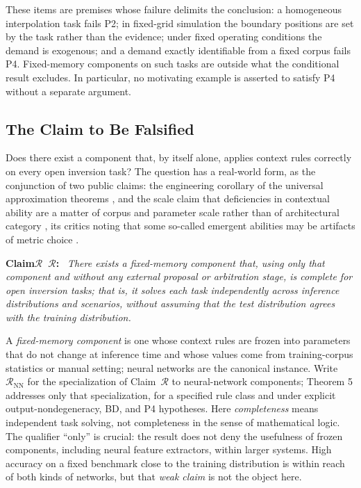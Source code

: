 \documentclass[twoside,11pt]{article}
\newenvironment{claim}[1][]{\par\medskip\noindent\textbf{Claim\ifx\relax#1\relax\else\ #1\fi:}\ \itshape}{\par\medskip} %
\begin{document}
These items are premises whose failure delimits the conclusion: a homogeneous interpolation task fails P2; in fixed-grid simulation the boundary positions are set by the task rather than the evidence; under fixed operating conditions the demand is exogenous; and a demand exactly identifiable from a fixed corpus fails P4. Fixed-memory components on such tasks are outside what the conditional result excludes. In particular, no motivating example is asserted to satisfy P4 without a separate argument.

\subsection{The Claim to Be Falsified}

Does there exist a component that, by itself alone, applies context rules correctly on every open inversion task? The question has a real-world form, as the conjunction of two public claims: the engineering corollary of the universal approximation theorems \citep{cybenko1989,hornik1989}, and the scale claim that deficiencies in contextual ability are a matter of corpus and parameter scale rather than of architectural category \citep{bubeck2023}, its critics noting that some so-called emergent abilities may be artifacts of metric choice \citep{schaeffer2023}.

\begin{claim}[$\mathcal{R}$]
There exists a fixed-memory component that, using only that component and without any external proposal or arbitration stage, is complete for open inversion tasks; that is, it solves each task independently across inference distributions and scenarios, without assuming that the test distribution agrees with the training distribution.
\end{claim}

A \emph{fixed-memory component} is one whose context rules are frozen into parameters that do not change at inference time and whose values come from training-corpus statistics or manual setting; neural networks are the canonical instance. Write $\mathcal{R}_{\mathrm{NN}}$ for the specialization of Claim~$\mathcal{R}$ to neural-network components; Theorem 5 addresses only that specialization, for a specified rule class and under explicit output-nondegeneracy, BD, and P4 hypotheses. Here \emph{completeness} means independent task solving, not completeness in the sense of mathematical logic. The qualifier ``only'' is crucial: the result does not deny the usefulness of frozen components, including neural feature extractors, within larger systems. High accuracy on a fixed benchmark close to the training distribution is within reach of both kinds of networks, but that \emph{weak claim} is not the object here.
\end{document}
